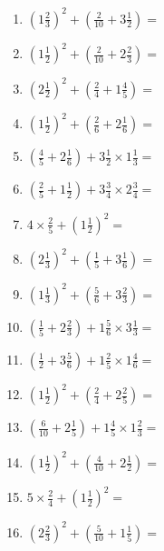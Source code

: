 \documentclass[12pt]{article}
\begin{document}
\begin{enumerate}
\newpage
\item \large $ (1 \frac{2}{3})^2 + (\frac{2}{10} + 3 \frac{1}{2}) = $ \vspace{1.8cm}
\item \large $ (1 \frac{1}{2})^2 + (\frac{2}{10} + 2 \frac{2}{3}) = $ \vspace{1.8cm}
\item \large $ (2 \frac{1}{2})^2 + (\frac{2}{4} + 1 \frac{4}{5}) = $ \vspace{1.8cm}
\item \large $ (1 \frac{1}{2})^2 + (\frac{2}{6} + 2 \frac{1}{6}) = $ \vspace{1.8cm}
\item \large $ (\frac{4}{5} + 2 \frac{1}{6}) + 3 \frac{1}{2} \times 1 \frac{1}{3} = $ \vspace{1.8cm}
\item \large $ (\frac{2}{5} + 1 \frac{1}{2}) + 3 \frac{3}{4} \times 2 \frac{3}{4} = $ \vspace{1.8cm}
\item \large $ 4 \times \frac{2}{5} + (1 \frac{1}{2})^2 = $ \vspace{1.8cm}
\item \large $ (2 \frac{1}{3})^2 + (\frac{1}{5} + 3 \frac{1}{6}) = $ \vspace{1.8cm}
\item \large $ (1 \frac{1}{3})^2 + (\frac{5}{6} + 3 \frac{2}{3}) = $ \vspace{1.8cm}
\item \large $ (\frac{1}{5} + 2 \frac{2}{3}) + 1 \frac{5}{6} \times 3 \frac{1}{3} = $ \vspace{1.8cm}
\newpage
\item \large $ (\frac{1}{2} + 3 \frac{5}{6}) + 1 \frac{2}{5} \times 1 \frac{4}{6} = $ \vspace{1.8cm}
\item \large $ (1 \frac{1}{2})^2 + (\frac{2}{4} + 2 \frac{2}{5}) = $ \vspace{1.8cm}
\item \large $ (\frac{6}{10} + 2 \frac{1}{5}) + 1 \frac{4}{5} \times 1 \frac{2}{3} = $ \vspace{1.8cm}
\item \large $ (1 \frac{1}{2})^2 + (\frac{4}{10} + 2 \frac{1}{2}) = $ \vspace{1.8cm}
\item \large $ 5 \times \frac{2}{4} + (1 \frac{1}{2})^2 = $ \vspace{1.8cm}
\item \large $ (2 \frac{2}{3})^2 + (\frac{5}{10} + 1 \frac{1}{5}) = $ \vspace{1.8cm}

\end{enumerate}
\end{document}
